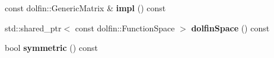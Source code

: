 \begin{DoxyCompactItemize}
\item 
\hypertarget{classSpacy_1_1FEniCS_1_1LinearOperator_ada709c74c2d78c5f7b2dcf274f743d9d}{}const dolfin\+::\+Generic\+Matrix \& {\bfseries impl} () const \label{classSpacy_1_1FEniCS_1_1LinearOperator_ada709c74c2d78c5f7b2dcf274f743d9d}

\item 
\hypertarget{classSpacy_1_1FEniCS_1_1LinearOperator_a9edb2a6eac66a2379792ef5580fcae75}{}std\+::shared\+\_\+ptr$<$ const dolfin\+::\+Function\+Space $>$ {\bfseries dolfin\+Space} () const \label{classSpacy_1_1FEniCS_1_1LinearOperator_a9edb2a6eac66a2379792ef5580fcae75}

\item 
\hypertarget{classSpacy_1_1FEniCS_1_1LinearOperator_aa83aaeab285efbb5d636054d06550d64}{}bool {\bfseries symmetric} () const \label{classSpacy_1_1FEniCS_1_1LinearOperator_aa83aaeab285efbb5d636054d06550d64}


\end{DoxyCompactItemize}
